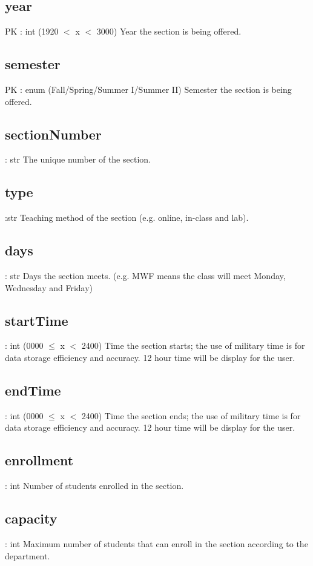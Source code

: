 	\subsection{year}
		PK : int (1920 $<$ x $<$ 3000) 
		Year the section is being offered.
		
	\subsection{semester}
		PK : enum (Fall/Spring/Summer I/Summer II)
		Semester the section is being offered.
	
	\subsection{sectionNumber}
	 	: str 
		The unique number of the section.
	
	\subsection{type}
	 	:str 
		Teaching method of the section (e.g. online, in-class and lab).   
	
	
	\subsection{days}
		: str 
		Days the section meets. (e.g. MWF means the class will meet Monday, Wednesday and Friday)
	
	\subsection{startTime}
		: int (0000 $\leq$ x $<$ 2400)
		Time the section starts; the use of military time is for data storage efficiency and accuracy. 12 hour time will be display for the user.
	
	\subsection{endTime}
	 	: int (0000 $\leq$ x $<$ 2400) 
		Time the section ends; the use of military time is for data storage efficiency and accuracy. 12 hour time will be display for the user.
	
	\subsection{enrollment}
		: int  
		Number of students enrolled in the section.
	
	\subsection{capacity}
		: int
		Maximum number of students that can enroll in the section according to the department. 
